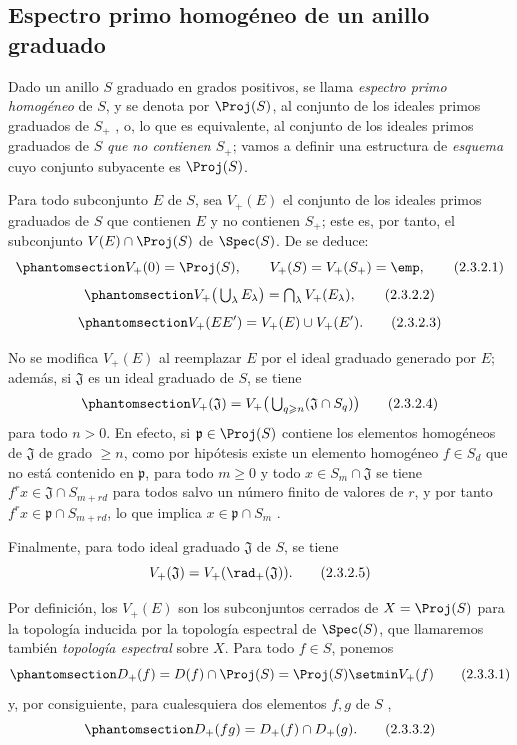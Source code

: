 \documentclass[oneside,10pt]{amsart}
\renewcommand{\geq}{\geqslant}
\newcommand{\oldpage}[2][]{\marginnote{\normalfont\footnotesize\textbf{#1}~|~#2}\ignorespaces}
\let\EGAOriginalLabel\label
\renewcommand{\label}[1]{\phantomsection\EGAOriginalLabel{#1}}
\begin{document}
\subsection{Espectro primo homogéneo de un anillo graduado}
\label{subsection:II.2.3}

\begin{env}[2.3.1]
\label{II.2.3.1}
Dado un anillo $S$ graduado en grados positivos, se llama \emph{espectro primo homogéneo} de $S$, y se denota por $\Proj(S)$, al conjunto de los ideales primos graduados de $S_+$ , o, lo que es equivalente, al conjunto de los ideales primos graduados de $S$ \emph{que no contienen $S_+$}; vamos a definir una estructura de \emph{esquema} cuyo conjunto subyacente es $\Proj(S)$.
\end{env}

\begin{env}[2.3.2]
\label{II.2.3.2}
Para todo subconjunto $E$ de $S$, sea $V_+(E)$ el conjunto de los ideales primos graduados de $S$ que contienen $E$ y no contienen $S_+$; este es, por tanto, el subconjunto $V(E)\cap\Proj(S)$ de $\Spec(S)$.
De  se deduce:
\[
\label{II.2.3.2.1}
  V_+(0)=\Proj(S),\qquad V_+(S)=V_+(S_+)=\emp,
\tag{2.3.2.1}
\]
\[
\label{II.2.3.2.2}
  V_+\big(\textstyle\bigcup_\lambda E_\lambda\big)
  =\textstyle\bigcap_\lambda V_+(E_\lambda),
\tag{2.3.2.2}
\]
\[
\label{II.2.3.2.3}
  V_+(EE')=V_+(E)\cup V_+(E').
\tag{2.3.2.3}
\]

No se modifica $V_+(E)$ al reemplazar $E$ por el ideal graduado generado por $E$; además, si $\mathfrak{J}$ es un ideal graduado de $S$, se tiene
\[
\label{II.2.3.2.4}
  V_+(\mathfrak{J})
  =V_+\big(\textstyle\bigcup_{q\geq n}(\mathfrak{J}\cap S_q)\big)
\tag{2.3.2.4}
\]
\oldpage[II]{26}
para todo $n>0$.
En efecto, si $\mathfrak{p}\in\Proj(S)$ contiene los elementos homogéneos de $\mathfrak{J}$ de grado $\geq n$, como por hipótesis existe un elemento homogéneo $f\in S_d$ que no está contenido en $\mathfrak{p}$, para todo $m\geq0$ y todo $x\in S_m\cap\mathfrak{J}$ se tiene $f^rx\in\mathfrak{J}\cap S_{m+rd}$ para todos salvo un número finito de valores de $r$, y por tanto $f^rx\in\mathfrak{p}\cap S_{m+rd}$, lo que implica $x\in\mathfrak{p}\cap S_m$ .

Finalmente, para todo ideal graduado $\mathfrak{J}$ de $S$, se tiene
\[
  V_+(\mathfrak{J})=V_+(\rad_+(\mathfrak{J})).
\tag{2.3.2.5}
\]
\end{env}

\begin{env}[2.3.3]
\label{II.2.3.3}
Por definición, los $V_+(E)$ son los subconjuntos cerrados de $X=\Proj(S)$ para la topología inducida por la topología espectral de $\Spec(S)$, que llamaremos también \emph{topología espectral} sobre $X$.
Para todo $f\in S$, ponemos
\[
\label{II.2.3.3.1}
  D_+(f)=D(f)\cap\Proj(S)=\Proj(S)\setmin V_+(f)
\tag{2.3.3.1}
\]
y, por consiguiente, para cualesquiera dos elementos $f,g$ de $S$ ,
\[
\label{II.2.3.3.2}
  D_+(fg)=D_+(f)\cap D_+(g).
\tag{2.3.3.2}
\]
\end{env}
\end{document}
